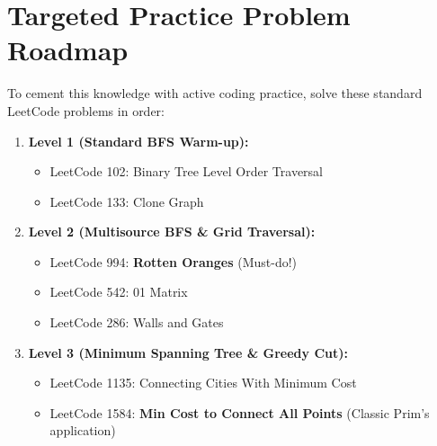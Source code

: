 \documentclass[10pt,journal,compsoc,onecolumn]{IEEEtran}
\begin{document}
\section{Targeted Practice Problem Roadmap}
\label{sec:practice}

To cement this knowledge with active coding practice, solve these standard LeetCode problems in order:

\begin{enumerate}
    \item \textbf{Level 1 (Standard BFS Warm-up):}
    \begin{itemize}
        \item LeetCode 102: Binary Tree Level Order Traversal
        \item LeetCode 133: Clone Graph
    \end{itemize}
    \item \textbf{Level 2 (Multisource BFS \& Grid Traversal):}
    \begin{itemize}
        \item LeetCode 994: \textbf{Rotten Oranges} (Must-do!)
        \item LeetCode 542: 01 Matrix
        \item LeetCode 286: Walls and Gates
    \end{itemize}
    \item \textbf{Level 3 (Minimum Spanning Tree \& Greedy Cut):}
    \begin{itemize}
        \item LeetCode 1135: Connecting Cities With Minimum Cost
        \item LeetCode 1584: \textbf{Min Cost to Connect All Points} (Classic Prim's application)
    \end{itemize}
\end{enumerate}
\end{document}
